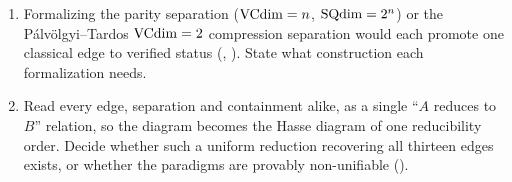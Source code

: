 \begin{enumerate}[leftmargin=*,itemsep=3pt]
\item Formalizing the parity separation ($\mathrm{VCdim} = n$, $\mathrm{SQdim} = 2^n$) or the P\'alv\"olgyi--Tardos $\mathrm{VCdim} = 2$ compression separation would each promote one classical edge to verified status (, ). State what construction each formalization needs.

\item Read every edge, separation and containment alike, as a single ``$A$ reduces to $B$'' relation, so the diagram becomes the Hasse diagram of one reducibility order. Decide whether such a uniform reduction recovering all thirteen edges exists, or whether the paradigms are provably non-unifiable ().
\end{enumerate}

